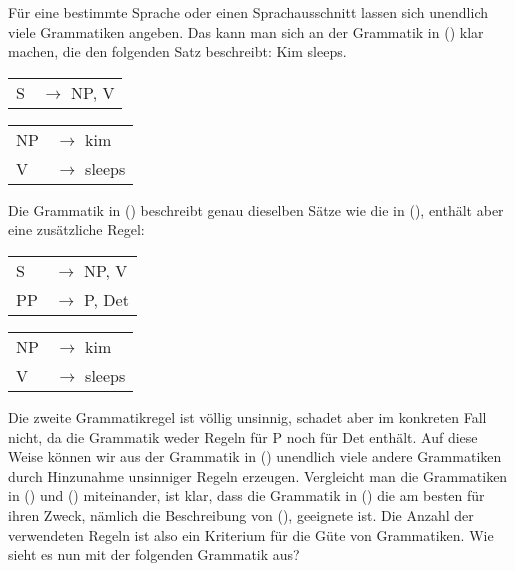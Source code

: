 Für eine bestimmte Sprache oder einen Sprachausschnitt lassen sich unendlich viele
Grammatiken angeben. Das kann man sich an der Grammatik in () klar machen,
die den folgenden Satz beschreibt:
\ea
Kim sleeps.
\z
\ea\label{gram-kim-sleeps-v}
\begin{tabular}[t]{@{}l@{ }l}       
{S}  & {$\to$ NP, V}
\end{tabular}\hspace{2cm}%
\begin{tabular}[t]{@{}l@{ }l}
{NP} & {$\to$ kim}\\
{V} & {$\to$ sleeps}\\
\end{tabular}
\z
Die Grammatik in () beschreibt genau dieselben Sätze wie die in (),
enthält aber eine zusätzliche Regel:
\ea
\begin{tabular}[t]{@{}l@{ }l}       
{S}  & {$\to$ NP, V}\\
PP   & {$\to$ P, Det}\\
\end{tabular}\hspace{2cm}%
\begin{tabular}[t]{@{}l@{ }l}
{NP} & {$\to$ kim}\\
{V} & {$\to$ sleeps}\\
\end{tabular}
\z
Die zweite Grammatikregel ist völlig unsinnig, schadet aber im konkreten Fall nicht,
da die Grammatik weder Regeln für P noch für Det enthält. Auf diese Weise können wir aus
der Grammatik in () unendlich viele andere Grammatiken durch Hinzunahme unsinniger
Regeln erzeugen. Vergleicht man die Grammatiken in () und () miteinander,
ist klar, dass die Grammatik in () die am besten für ihren Zweck, nämlich die Beschreibung
von (), geeignete ist. Die Anzahl der verwendeten Regeln ist also ein Kriterium für die
Güte von Grammatiken. Wie sieht es nun mit der folgenden Grammatik aus?

